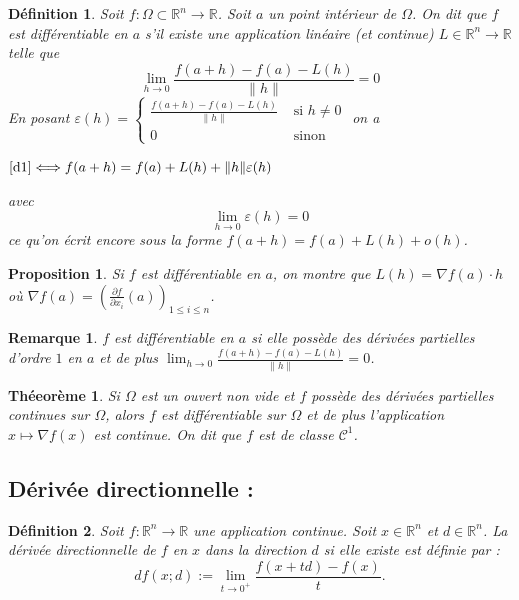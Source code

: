 \documentclass[12pt,a4paper,openay]{book}
\newtheorem{Def}{D\'efinition}[chapter]
\numberwithin{equation}{chapter}
\newtheorem{theo}{Th\'eeor\`eme}[chapter]
\newtheorem{rmq}{Remarque}[chapter]
\newtheorem{prop}{Proposition}[chapter]
\newcommand{\R}{\mathbb{R}}
\begin{document}
	\begin{Def}
	Soit $f:\Omega \subset \R^n \to \R$. Soit $a$ un point intérieur de $\Omega$. On dit que $f$ est différentiable en $a$ s'il existe une application linéaire (et continue) $L\in \R^n \to \R$ telle que 
	\begin{equation}
	\lim_{h\to 0} \frac{f(a+h)- f(a) -L(h)}{\|h\|} =0 \label{d1}
	\end{equation}
	En posant $\varepsilon(h)=\begin{cases}
	 \frac{f(a+h)- f(a) -L(h)}{\|h\|}&\text{ si } h\neq 0\\
	 0&\text{ sinon}
	\end{cases}$ on a 
	
	$\eqref{d1} \Longleftrightarrow f(a+h)=f(a )+ L(h) +\|h\| \varepsilon(h)$
	
	avec $$\lim\limits_{h\to 0} \varepsilon(h)=0$$
	ce qu'on écrit encore sous la forme $f(a+h)=f(a)+L(h) +o(h)$.
	\end{Def}
	\begin{prop}
	Si $f$ est différentiable en $a$, on montre que $L(h)=\nabla f(a)\cdot h$ où $\nabla f(a) =\left(\frac{\partial f}{\partial x_i}(a) \right)_{1\leq i\leq n}$.
	\end{prop}
	\begin{rmq}
	$f$ est différentiable en $a$ si elle possède des dérivées partielles d'ordre $1$ en $a$ et de plus $\lim_{h\to 0} \frac{f(a+h)- f(a) -L(h)}{\|h\|} =0$.
	\end{rmq}
	\begin{theo}
	Si $\Omega$ est un ouvert non vide et $f$ possède des dérivées partielles continues sur $\Omega$, alors $f$ est différentiable sur $\Omega$ et de plus l'application $x\mapsto \nabla f(x)$ est continue. On dit que $f$ est de classe $\mathcal{C}^1$.
	\end{theo}
	\subsection{D\'eriv\'ee directionnelle :}
	
	\begin{Def}
		Soit $f: \R^n \to \R$ une application continue.
		Soit $x \in \R^n$ et $d \in \R^n$.
		La d\'eriv\'ee directionnelle de $f$ en $x$ dans la direction $d$ si elle existe est d\'efinie par :
		$$
		d f(x ; d):=\lim _{t \to 0^{+}} \frac{f(x+t d)-f(x)}{t}.
		$$
	\end{Def}
	
\end{document}
